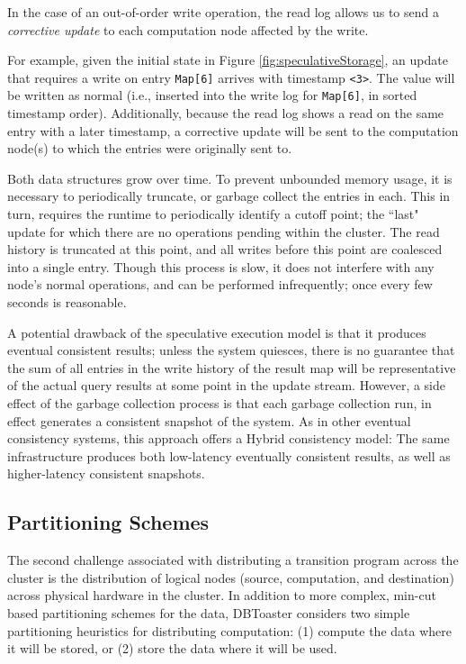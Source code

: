 In the case of an out-of-order write operation, the read log allows us to send a
\textit{corrective update} to each computation node affected by the write.

For example, given the initial state in Figure \ref{fig:speculativeStorage}, an
update that requires a write on entry \texttt{Map[6]} arrives with timestamp
\texttt{<3>}.  The value will be written as normal (i.e., inserted into the
write log for \texttt{Map[6]}, in sorted timestamp order).  Additionally,
because the read log shows a read on the same entry with a later timestamp, a
corrective update will be sent to the computation node(s) to which the entries
were originally sent to.

Both data structures grow over time.  To prevent unbounded memory usage, it is
necessary to periodically truncate, or garbage collect the entries in each. 
This in turn, requires the runtime to periodically identify a cutoff point; the
``last" update for which there are no operations pending within the cluster. 
The read history is truncated at this point, and all writes before this point
are coalesced into a single entry.  Though this process is slow, it does not
interfere with any node's normal operations, and can be performed infrequently;
once every few seconds is reasonable.

A potential drawback of the speculative execution model is that it produces
eventual consistent results; unless the system quiesces, there is no guarantee
that the sum of all entries in the write history of the result map will be
representative of the actual query results at some point in the update stream. 
However, a side effect of the garbage collection process is that each garbage
collection run, in effect generates a consistent snapshot of the system.  As in
other eventual consistency systems\cite{bayou}, this approach offers a Hybrid
consistency model: The same infrastructure produces both low-latency eventually
consistent results, as well as higher-latency consistent snapshots.

\subsection{Partitioning Schemes}
The second challenge associated with distributing a transition program across
the cluster is the distribution of logical nodes (source, computation, and
destination) across physical hardware in the cluster.  In addition to more
complex, min-cut based partitioning schemes for the data, DBToaster considers
two simple partitioning heuristics for distributing computation: (1) compute the
data where it will be stored, or (2) store the data where it will be used.


